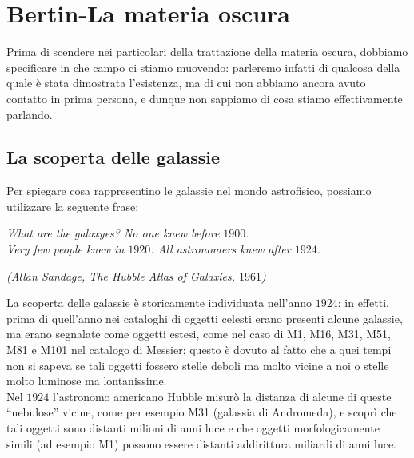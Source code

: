 \chapter[La materia oscura]{Bertin-La materia oscura}

Prima di scendere nei particolari della trattazione della materia oscura, dobbiamo specificare in che campo ci stiamo muovendo: parleremo infatti di qualcosa della quale è stata dimostrata l'esistenza, ma di cui non abbiamo ancora avuto contatto in prima persona, e dunque non sappiamo di cosa stiamo effettivamente parlando.

\section{La scoperta delle galassie}

Per spiegare cosa rappresentino le galassie nel mondo astrofisico, possiamo utilizzare la seguente frase:
\begin{center}
\emph{What are the galaxyes? No one knew before $1900$.\\
Very few people knew in $1920$. All astronomers knew after $1924$.\\}
\end{center}
\begin{center}
\textit{(Allan Sandage, The Hubble Atlas of Galaxies, $1961$)\\}
\end{center}
La scoperta delle galassie è storicamente individuata nell'anno $1924$; in effetti, prima di quell'anno nei cataloghi di oggetti celesti erano presenti alcune galassie, ma erano segnalate come oggetti estesi, come nel caso di M1, M16, M31, M51, M81 e M101 nel catalogo di Messier; questo è dovuto al fatto che a quei tempi non si sapeva se tali oggetti fossero stelle deboli ma molto vicine a noi o stelle molto luminose ma lontanissime.\\
Nel $1924$ l'astronomo americano Hubble misurò la distanza di alcune di queste ``nebulose'' vicine, come per esempio M31 (galassia di Andromeda), e scoprì che tali oggetti sono distanti milioni di anni luce e che oggetti morfologicamente simili (ad esempio M1) possono essere distanti addirittura miliardi di anni luce.\\

